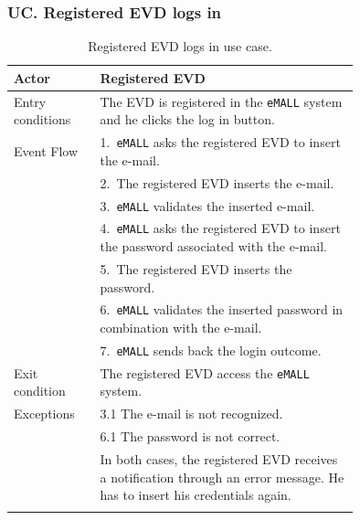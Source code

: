 \subsubsection*{UC\cuc . Registered EVD logs in}
\begin{center}
    \begin{longtable}{lp{0.75\linewidth}}
        \hline
        Actor            & Registered EVD                                                                              \\
        \hline
        Entry conditions & The EVD is registered in the \verb|eMALL| system and he clicks the log in button.           \\
        \hline
        Event Flow       & 1.\ \verb|eMALL| asks the registered EVD to insert the e-mail.                              \\
        & 2.\ The registered EVD inserts the e-mail.                                                  \\
        & 3.\ \verb|eMALL| validates the inserted e-mail.                                             \\
        & 4.\ \verb|eMALL| asks the registered EVD to insert the password associated with the e-mail. \\
        & 5.\ The registered EVD inserts the password.                                                \\
        & 6.\ \verb|eMALL| validates the inserted password in combination with the e-mail.            \\
        & 7.\ \verb|eMALL| sends back the login outcome.                                              \\
        \hline
        Exit condition   & The registered EVD access the \verb|eMALL| system.                                          \\
        \hline
        Exceptions       & 3.1 The e-mail is not recognized.                                                           \\
        & 6.1 The password is not correct.                                                            \\
        & In both cases, the registered EVD receives a notification through an error message.
        He has to insert his credentials again. \\
        \hline
        \caption{Registered EVD logs in use case.}
        \label{tab: EVD_logs_in_use_case}
    \end{longtable}



\end{center}
